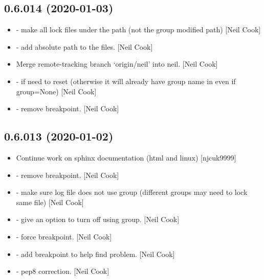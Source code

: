 \documentclass[a4paper,10pt,english]{report}
\begin{document}
\subsection{0.6.014 (2020-01-03)}
\label{\detokenize{misc/changelog:id4}}\begin{itemize}
\item {} 
 - make all lock files under the  path (not
the group modified path) {[}Neil Cook{]}

\item {} 
 - add absolute path to the files. {[}Neil Cook{]}

\item {} 
Merge remote-tracking branch ‘origin/neil’ into neil. {[}Neil Cook{]}

\item {} 
 - if  need to reset 
(otherwise it will already have group name in even if group=None)
{[}Neil Cook{]}

\item {} 
 - remove breakpoint. {[}Neil Cook{]}

\end{itemize}


\subsection{0.6.013 (2020-01-02)}
\label{\detokenize{misc/changelog:id5}}\begin{itemize}
\item {} 
Continue work on sphinx documentation (html and linux) {[}njcuk9999{]}

\item {} 
 - remove breakpoint. {[}Neil Cook{]}

\item {} 
 - make sure log file does not use group
(different groups may need to lock same file) {[}Neil Cook{]}

\item {} 
 - give an option to turn off using group. {[}Neil
Cook{]}

\item {} 
 - force breakpoint. {[}Neil Cook{]}

\item {} 
 - add breakpoint to help find
problem. {[}Neil Cook{]}

\item {} 
 - pep8 correction. {[}Neil Cook{]}

\end{itemize}
\end{document}
